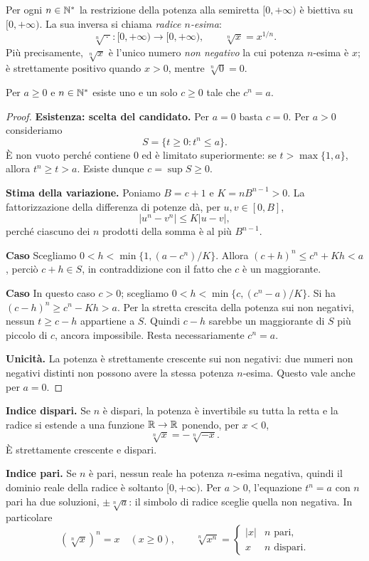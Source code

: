Per ogni $n\in\mathbb{N}^*$ la restrizione della potenza alla semiretta $[0,+\infty)$ è biettiva su $[0,+\infty)$. La sua inversa si chiama \emph{radice $n$-esima}:
\[
\sqrt[n]{\,\cdot\,}\colon[0,+\infty)\longrightarrow[0,+\infty),
\qquad \sqrt[n]{x}=x^{1/n}.
\]
Più precisamente, $\sqrt[n]{x}$ è l'unico numero \emph{non negativo} la cui potenza $n$-esima è $x$; è strettamente positivo quando $x>0$, mentre $\sqrt[n]{0}=0$.

\begin{proposizione}
Per $a\ge0$ e $n\in\mathbb{N}^*$ esiste uno e un solo $c\ge0$ tale che $c^n=a$.
\end{proposizione}
\begin{proof}
\textbf{Esistenza: scelta del candidato.} Per $a=0$ basta $c=0$. Per $a>0$ consideriamo
\[
S=\{t\ge0:t^n\le a\}.
\]
È non vuoto perché contiene $0$ ed è limitato superiormente: se $t>\max\{1,a\}$, allora $t^n\ge t>a$. Esiste dunque $c=\sup S\ge0$.

\textbf{Stima della variazione.} Poniamo $B=c+1$ e $K=nB^{n-1}>0$. La fattorizzazione della differenza di potenze dà, per $u,v\in[0,B]$,
\[
|u^n-v^n|\le K|u-v|,
\]
perché ciascuno dei $n$ prodotti della somma è al più $B^{n-1}$.

\textbf{Caso}\enspace{} Scegliamo $0<h<\min\{1,(a-c^n)/K\}$. Allora $(c+h)^n\le c^n+Kh<a$, perciò $c+h\in S$, in contraddizione con il fatto che $c$ è un maggiorante.

\textbf{Caso}\enspace{} In questo caso $c>0$; scegliamo $0<h<\min\{c,(c^n-a)/K\}$. Si ha $(c-h)^n\ge c^n-Kh>a$. Per la stretta crescita della potenza sui non negativi, nessun $t\ge c-h$ appartiene a $S$. Quindi $c-h$ sarebbe un maggiorante di $S$ più piccolo di $c$, ancora impossibile. Resta necessariamente $c^n=a$.

\textbf{Unicità.} La potenza è strettamente crescente sui non negativi: due numeri non negativi distinti non possono avere la stessa potenza $n$-esima. Questo vale anche per $a=0$.
\end{proof}

\textbf{Indice dispari.} Se $n$ è dispari, la potenza è invertibile su tutta la retta e la radice si estende a una funzione $\mathbb{R}\to\mathbb{R}$ ponendo, per $x<0$,
\[
\sqrt[n]{x}=-\sqrt[n]{-x}.
\]
È strettamente crescente e dispari.

\textbf{Indice pari.} Se $n$ è pari, nessun reale ha potenza $n$-esima negativa, quindi il dominio reale della radice è soltanto $[0,+\infty)$. Per $a>0$, l'equazione $t^n=a$ con $n$ pari ha due soluzioni, $\pm\sqrt[n]{a}$: il simbolo di radice sceglie quella non negativa. In particolare
\[
(\sqrt[n]{x})^n=x\quad(x\ge0),\qquad
\sqrt[n]{x^n}=\begin{cases}|x|&n\text{ pari},\\x&n\text{ dispari}.
\end{cases}
\]

